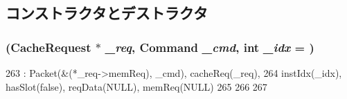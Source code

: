 \subsection{コンストラクタとデストラクタ}
\hypertarget{classCacheReqPacket_a6c9a8817086ff7350caa2bf976f7b7b7}{
\subsubsection[{CacheReqPacket}]{ ({\bf CacheRequest} $\ast$ {\em \_\-req}, \/  {\bf Command} {\em \_\-cmd}, \/  int {\em \_\-idx} = {})}}
\label{classCacheReqPacket_a6c9a8817086ff7350caa2bf976f7b7b7}



\begin{DoxyCode}
263         : Packet(&(*_req->memReq), _cmd), cacheReq(_req),
264           instIdx(_idx), hasSlot(false), reqData(NULL), memReq(NULL)
265     {
266 
267     }
\end{DoxyCode}


